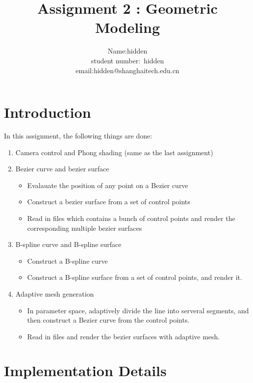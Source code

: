\documentclass[acmtog]{acmart}
\title{{Assignment 2 : Geometric Modeling}}
\author{Name:\quad hidden  \\ student number:\ hidden
\\email:\quad hidden@shanghaitech.edu.cn}
\newcommand{\code}[1]{\texttt{\color{magenta}{#1}}} %
\begin{document}
\maketitle

\vspace*{2 ex}

\section{Introduction}
In this assignment, the following things are done:
\begin{enumerate}
	\item Camera control and Phong shading (same as the last assignment)

	\item Bezier curve and bezier surface
	
	\begin{itemize}
		\item Evalauate the position of any point on a Bezier curve
		\item Construct a bezier surface from a set of control points
		\item Read in \code{.bzs} files which contains a bunch of control points and render the corresponding multiple bezier surfaces
	\end{itemize}

	\item B-spline curve and B-spline surface
	
	\begin{itemize}
		\item Construct a B-spline curve
		\item Construct a B-spline surface from a set of control points, and render it.
	\end{itemize}

	\item Adaptive mesh generation
	\begin{itemize}
		\item In parameter space, adaptively divide the line into serveral segments, and then construct a Bezier curve from the control points. 
		\item Read in \code{.bzs} files and render the bezier surfaces with adaptive mesh.
	\end{itemize}
\end{enumerate}


\section{Implementation Details}
\end{document}
